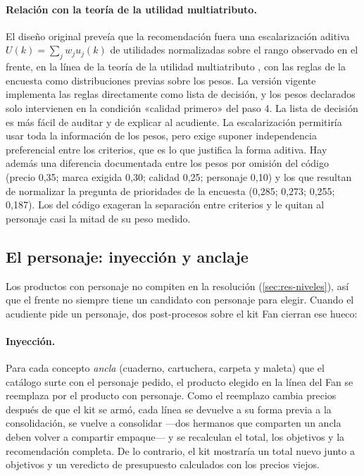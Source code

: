 \paragraph{Relación con la teoría de la utilidad multiatributo.} El diseño
original preveía que la recomendación fuera una escalarización aditiva
$U(k)=\sum_jw_ju_j(k)$ de utilidades normalizadas sobre el rango observado en
el frente, en la línea de la teoría de la utilidad multiatributo
\cite{keeney1976}, con las reglas de la encuesta como distribuciones previas
sobre los pesos. La versión vigente implementa las reglas directamente como
lista de decisión, y los pesos declarados solo intervienen en la condición
«calidad primero» del paso 4. La lista de decisión es más fácil de auditar y
de explicar al acudiente. La escalarización permitiría usar toda la
información de los pesos, pero exige suponer independencia preferencial
entre los criterios, que es lo que justifica la forma aditiva. Hay además una
diferencia documentada entre los pesos por omisión del código
(precio 0,35; marca exigida 0,30; calidad 0,25; personaje 0,10) y los que
resultan de normalizar la pregunta de prioridades de la encuesta
(0,285; 0,273; 0,255; 0,187). Los del código exageran la separación entre
criterios y le quitan al personaje casi la mitad de su peso medido.

\subsection{El personaje: inyección y anclaje}
\label{sec:opt-personaje}

Los productos con personaje no compiten en la resolución
(\cref{sec:res-niveles}), así que el frente no siempre tiene un candidato con
personaje para elegir. Cuando el acudiente pide un personaje, dos
post-procesos sobre el kit Fan cierran ese hueco:

\paragraph{Inyección.} Para cada concepto \emph{ancla} (cuaderno, cartuchera,
carpeta y maleta) que el catálogo surte con el personaje pedido, el producto
elegido en la línea del Fan se reemplaza por el producto con personaje. Como
el reemplazo cambia precios después de que el kit se armó, cada línea se
devuelve a su forma previa a la consolidación, se vuelve a consolidar ---dos
hermanos que comparten un ancla deben volver a compartir empaque--- y se
recalculan el total, los objetivos y la recomendación completa. De lo
contrario, el kit mostraría un total nuevo junto a objetivos y un veredicto
de presupuesto calculados con los precios viejos.

